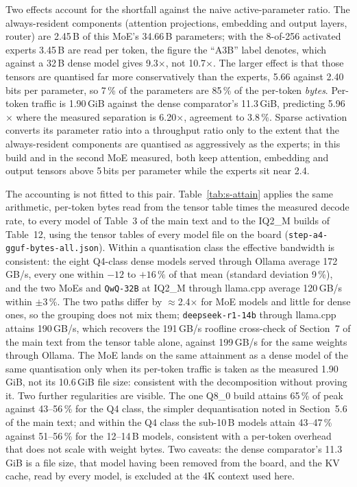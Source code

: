 \documentclass[11pt,a4paper]{article}
\begin{document}
Two effects account for the shortfall against the naive
active-parameter ratio.  The always-resident components (attention
projections, embedding and output layers, router) are 2.45\,B of this
MoE's 34.66\,B parameters; with the 8-of-256 activated experts 3.45\,B
are read per token, the figure the ``A3B'' label denotes, which
against a 32\,B dense model gives 9.3$\times$, not 10.7$\times$.  The
larger effect is that those tensors are quantised far more
conservatively than the experts, 5.66 against 2.40 bits per parameter,
so 7\,\% of the parameters are 85\,\% of the per-token \emph{bytes}.
Per-token traffic is 1.90\,GiB against the dense comparator's
11.3\,GiB, predicting 5.96$\times$ where the measured separation is
6.20$\times$, agreement to 3.8\,\%.  Sparse activation converts its
parameter ratio into a throughput ratio only to the extent that the
always-resident components are quantised as aggressively as the
experts; in this build and in the second MoE measured, both keep
attention, embedding and output tensors above 5\,bits per parameter
while the experts sit near 2.4.

The accounting is not fitted to this pair.  Table~\ref{tab:s-attain}
applies the same arithmetic, per-token bytes read from the tensor
table times the measured decode rate, to every model of Table~3 of the
main text and to the IQ2\_M builds of Table~12, using the tensor tables
of every model file on the board
(\texttt{step-a4-gguf-bytes-all.json}).  Within a quantisation class
the effective bandwidth is consistent: the eight Q4-class dense models
served through Ollama average 172\,GB/s, every one within $-12$ to
$+16\,\%$ of that mean (standard deviation 9\,\%), and the two MoEs
and \texttt{QwQ-32B} at IQ2\_M through llama.cpp average 120\,GB/s
within $\pm$3\,\%.  The two paths differ by $\approx$2.4$\times$ for
MoE models and little for dense ones, so the grouping does not mix
them; \texttt{deepseek-r1-14b} through llama.cpp attains 190\,GB/s,
which recovers the 191\,GB/s roofline cross-check of Section~7 of the
main text from the tensor table alone, against 199\,GB/s for the same
weights through Ollama.  The MoE lands on the same attainment as a
dense model of the same quantisation only when its per-token traffic
is taken as the measured 1.90\,GiB, not its 10.6\,GiB file size:
consistent with the decomposition without proving it.  Two further
regularities are visible.  The one Q8\_0 build attains 65\,\% of peak
against 43--56\,\% for the Q4 class, the simpler dequantisation noted
in Section~5.6 of the main text; and within the Q4 class the sub-10\,B
models attain 43--47\,\% against 51--56\,\% for the 12--14\,B models,
consistent with a per-token overhead that does not scale with weight
bytes.  Two caveats: the dense comparator's 11.3\,GiB is a file size,
that model having been removed from the board, and the KV cache, read
by every model, is excluded at the 4K context used here.
\end{document}
